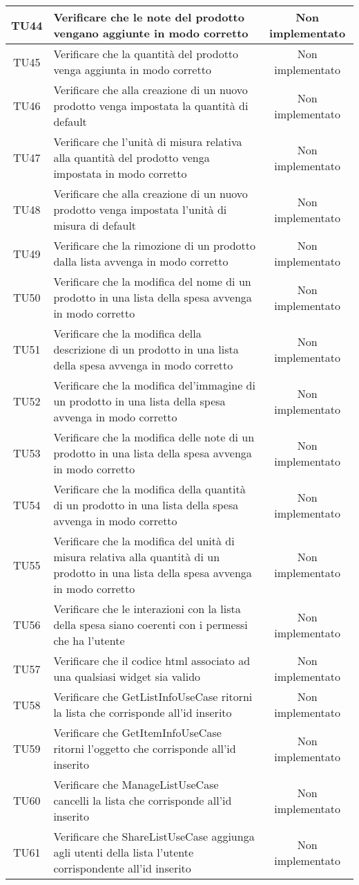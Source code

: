 \begin{center}
\begin{longtable}{|c|>{\centering}m{10cm}|c|}
		TU44 & Verificare che le note del prodotto vengano aggiunte in modo corretto & Non implementato \\ \hline
		TU45 & Verificare che la quantità del prodotto venga aggiunta in modo corretto & Non implementato \\ \hline
		TU46 & Verificare che alla creazione di un nuovo prodotto venga impostata la quantità di default & Non implementato \\ \hline
		TU47 & Verificare che l'unità di misura relativa alla quantità del prodotto venga impostata in modo corretto & Non implementato \\ \hline
		TU48 & Verificare che alla creazione di un nuovo prodotto venga impostata l'unità di misura di default & Non implementato \\ \hline
		TU49 & Verificare che la rimozione di un prodotto dalla lista avvenga in modo corretto & Non implementato \\ \hline
		TU50 & Verificare che la modifica del nome di un prodotto in una lista della spesa avvenga in modo corretto & Non implementato \\ \hline
		TU51 & Verificare che la modifica della descrizione di un prodotto in una lista della spesa avvenga in modo corretto & Non implementato \\ \hline
		TU52 & Verificare che la modifica del'immagine di un prodotto in una lista della spesa avvenga in modo corretto & Non implementato \\ \hline
		TU53 & Verificare che la modifica delle note di un prodotto in una lista della spesa avvenga in modo corretto & Non implementato \\ \hline
		TU54 & Verificare che la modifica della quantità di un prodotto in una lista della spesa avvenga in modo corretto & Non implementato \\ \hline
		TU55 & Verificare che la modifica del unità di misura relativa alla quantità di un prodotto in una lista della spesa avvenga in modo corretto & Non implementato \\ \hline
		TU56 & Verificare che le interazioni con la lista della spesa siano coerenti con i permessi che ha l'utente & Non implementato \\ \hline
		TU57 & Verificare che il codice html associato ad una qualsiasi widget sia valido & Non implementato \\ \hline
		TU58 & Verificare che GetListInfoUseCase ritorni la lista che corrisponde all'id inserito & Non implementato \\ \hline
		TU59 & Verificare che GetItemInfoUseCase ritorni l'oggetto che corrisponde all'id inserito & Non implementato \\ \hline
		TU60 & Verificare che ManageListUseCase cancelli la lista che corrisponde all'id inserito & Non implementato \\ \hline
		TU61 & Verificare che ShareListUseCase aggiunga agli utenti della lista l'utente corrispondente all'id inserito & Non implementato \\ \hline
	\end{longtable}
\end{center}
